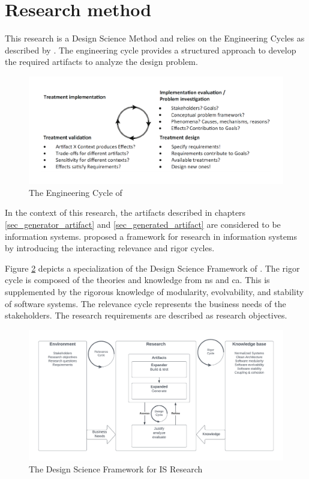 \section{Research method} \label{sec_research_method}

This research is a Design Science Method and relies on the Engineering Cycles as described
by \textcite{wieringa_design_2014}. The engineering cycle provides a structured approach
to develop the required artifacts to analyze the design problem.

\begin{figure}[H]
    \centering
    \includegraphics[width=1\textwidth]{figures/engineering_cycle.pdf}
    \caption[Engineering cycle]{The Engineering Cycle of \textcite{wieringa_design_2014}}
    \label{fig_engineering_cycle}
\end{figure}

In the context of this research, the artifacts described in chapters
\ref{sec_generator_artifact} and \ref{sec_generated_artifact} are considered to be
information systems. \citeauthor{hevner_design_2004} proposed a framework for research
in information systems by introducing the interacting relevance and rigor cycles.

Figure \ref{fig_dsr} depicts a specialization of the Design Science Framework of
\textcite{hevner_design_2004}. The rigor cycle is composed of the theories and knowledge
from \gls{ns} and \gls{ca}. This is supplemented by the rigorous knowledge of modularity,
evolvability, and stability of software systems. The relevance cycle represents the
business needs of the stakeholders. The research requirements are described as research
objectives.

\begin{figure}[H]
    \centering
    \includegraphics[width=1\textwidth]{figures/rigor_relevance_cycle.pdf}
    \caption[Design Science Framework for IS Research]{The Design Science Framework for IS Research}
    \label{fig_dsr}
\end{figure}